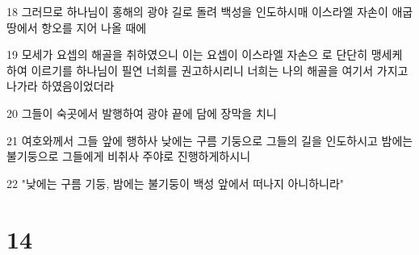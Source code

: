 \par 18 그러므로 하나님이 홍해의 광야 길로 돌려 백성을 인도하시매 이스라엘 자손이 애굽 땅에서 항오를 지어 나올 때에
\par 19 모세가 요셉의 해골을 취하였으니 이는 요셉이 이스라엘 자손으 로 단단히 맹세케 하여 이르기를 하나님이 필연 너희를 권고하시리니 너희는 나의 해골을 여기서 가지고 나가라 하였음이었더라
\par 20 그들이 숙곳에서 발행하여 광야 끝에 담에 장막을 치니
\par 21 여호와께서 그들 앞에 행하사 낮에는 구름 기둥으로 그들의 길을 인도하시고 밤에는 불기둥으로 그들에게 비취사 주야로 진행하게하시니
\par 22 "낮에는 구름 기둥, 밤에는 불기둥이 백성 앞에서 떠나지 아니하니라"

\chapter{14}


